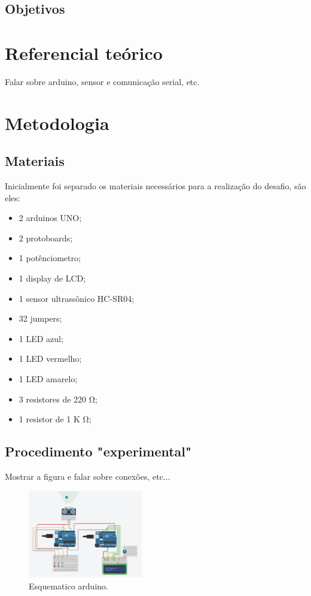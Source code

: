 \documentclass[conference]{IEEEtran}
\begin{document}
\subsection{Objetivos}

\section{Referencial teórico}
Falar sobre arduino, sensor e comunicação serial, etc.

\section{Metodologia}

\subsection{Materiais}
Inicialmente foi separado os materiais necessários para a realização do desafio, são eles:
\begin{itemize}
    \item 2 arduinos UNO;
    \item 2 protoboards;
    \item 1 potênciometro;
    \item 1 display de LCD;
    \item 1 sensor ultrassônico HC-SR04;
    \item 32 jumpers;
    \item 1 LED azul;
    \item 1 LED vermelho;
    \item 1 LED amarelo;
    \item 3 resistores de 220 \si{\ohm};
    \item 1 resistor de 1 K \si{\ohm};
\end{itemize}

\subsection{Procedimento "experimental"}

Mostrar a figura e falar sobre conexões, etc...

\begin{figure}[htbp]
    \centerline{
        \includegraphics[width=5cm]{images/esquema-arduino.png}
    }
    \caption{Esquematico arduino.}
    \label{fig}
\end{figure}
\end{document}
